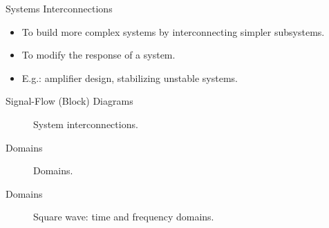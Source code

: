 
\begin{frame}{Systems Interconnections}
    \begin{itemize}
      \item To build more complex systems by interconnecting simpler subsystems.
      \item To modify the response of a system.
      \item E.g.: amplifier design, stabilizing unstable systems.
    \end{itemize}
\end{frame}

\begin{frame}[plain]{Signal-Flow (Block) Diagrams}
    \begin{figure}
        \centering
        
        \caption{System interconnections.}\label{fi:sys_interconnections}
    \end{figure}
\end{frame}


\begin{frame}[plain]{Domains}
    \begin{figure}
        \centering
        
        \caption{Domains.}\label{fi:domains}
    \end{figure}
\end{frame}


\begin{frame}[plain]{Domains}
    \begin{figure}
        \centering
        
        \caption{Square wave: time and frequency domains.}\label{fi:square_wave_approx}
    \end{figure}
\end{frame}
